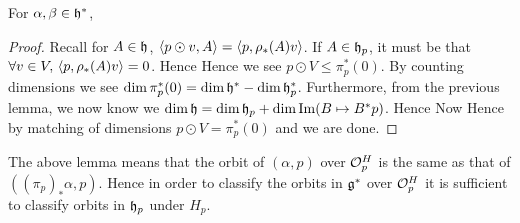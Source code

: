 \documentclass{article}
\begin{document}
\begin{lemma}
For $\alpha,\beta \in \mathfrak{h}^\ast$, 
\end{lemma}
\begin{proof}
Recall for $A \in \mathfrak{h}$, $\left\langle p \odot v, A \right\rangle = \left\langle p,\rho_\ast(A)v \right\rangle$. If $A \in \mathfrak{h}_p$, it must be that $\forall v \in V, \, \left\langle p,\rho_\ast(A)v \right\rangle=0$. Hence 
Hence we see $p \odot V \leq \pi_p^\ast(0) $. By counting dimensions we see $\dim \pi_p^\ast(0) = \dim\mathfrak{h}^\ast - \dim \mathfrak{h}_p^\ast$. Furthermore, from the previous lemma, we now know we $\dim \mathfrak{h} = \dim\mathfrak{h}_p + \dim\operatorname{Im}(B \mapsto B^\ast p)$. Hence 
Now 
Hence by matching of dimensions $p \odot V = \pi_p^\ast(0)$ and we are done. 
\end{proof}

The above lemma means that the orbit of $(\alpha,p)$ over $\mathcal{O}_p^H$ is the same as that of $((\pi_p)_\ast \alpha,p)$. Hence in order to classify the orbits in $\mathfrak{g}^\ast$ over $\mathcal{O}_p^H$ it is sufficient to classify orbits in $\mathfrak{h}_p$ under $H_p$. 
\end{document}
